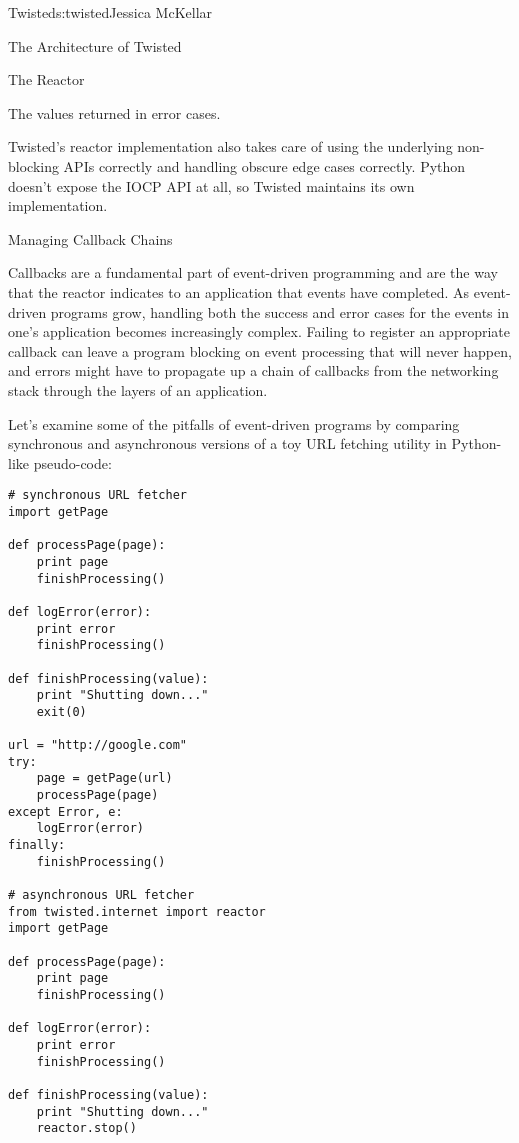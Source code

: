 \begin{aosachapter}{Twisted}{s:twisted}{Jessica McKellar}
\begin{aosasect1}{The Architecture of Twisted}
\begin{aosasect2}{The Reactor}
\begin{aosaitemize}
\item The values returned in error cases.

\end{aosaitemize}

Twisted's reactor implementation also takes care of using the underlying
non-blocking APIs correctly and handling obscure edge cases correctly. Python
doesn't expose the IOCP API at all, so Twisted maintains its own
implementation.

\end{aosasect2}

\begin{aosasect2}{Managing Callback Chains}

Callbacks are a fundamental part of event-driven programming and are the way
that the reactor indicates to an application that events have completed. As
event-driven programs grow, handling both the success and error cases for the
events in one's application becomes increasingly complex. Failing to register an
appropriate callback can leave a program blocking on event processing that will
never happen, and errors might have to propagate up a chain of callbacks from
the networking stack through the layers of an application.

Let's examine some of the pitfalls of event-driven programs by comparing
synchronous and asynchronous versions of a toy URL fetching utility in
Python-like pseudo-code:

\begin{verbatim}
# synchronous URL fetcher
import getPage

def processPage(page):
    print page
    finishProcessing()

def logError(error):
    print error
    finishProcessing()

def finishProcessing(value):
    print "Shutting down..."
    exit(0)

url = "http://google.com"
try:
    page = getPage(url)
    processPage(page)
except Error, e:
    logError(error)
finally:
    finishProcessing()

# asynchronous URL fetcher
from twisted.internet import reactor
import getPage

def processPage(page):
    print page
    finishProcessing()

def logError(error):
    print error
    finishProcessing()

def finishProcessing(value):
    print "Shutting down..."
    reactor.stop()


\end{verbatim}
\end{aosasect2}
\end{aosasect1}
\end{aosachapter}
